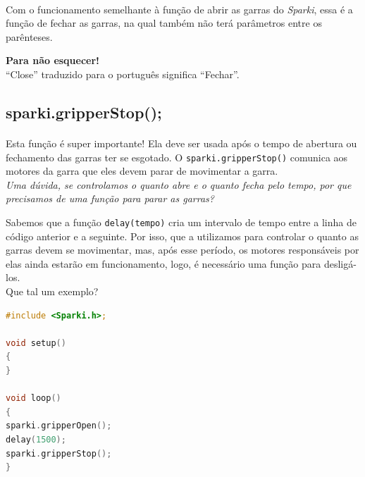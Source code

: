 \paragraph{}
Com o funcionamento semelhante à função de abrir as garras do \textsl{Sparki}, essa é a função de fechar as garras, na qual também não terá parâmetros entre os parênteses.

    \begin{center}
    \textcolor{mydarkblue}{\textbf{Para não esquecer!}}
    \\``Close'' traduzido para o português significa ``Fechar''.
    \end{center}
    
\subsection{sparki.gripperStop();}

\paragraph{}
Esta função é super importante! Ela deve ser usada após o tempo de abertura ou fechamento das garras ter se esgotado. O \lstinline[columns=fixed]{sparki.gripperStop()} comunica aos motores da garra que eles devem parar de movimentar a garra.\\

\textit{Uma dúvida, se controlamos o quanto abre e o quanto fecha pelo tempo, por que precisamos de uma função para parar as garras?} \par
Sabemos que a função \lstinline[columns=fixed]{delay(tempo)} cria um intervalo de tempo entre a linha de código anterior e a seguinte. Por isso, que a utilizamos para controlar o quanto as garras devem se movimentar, mas, após esse período, os motores responsáveis por elas ainda estarão em funcionamento, logo, é necessário uma função para desligá-los.\\

Que tal um exemplo?

    \begin{lstlisting}[language=C]
#include <Sparki.h>;

void setup()
{
}

void loop()
{
sparki.gripperOpen();  
delay(1500);           
sparki.gripperStop();
}
\end{lstlisting}

